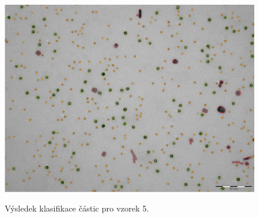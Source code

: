 \documentclass[11pt,twoside,a4paper,table]{book}
\begin{document}
\begin{figure}[h]
\center
\includegraphics[width=\textwidth]{figures/multi7_klasifikace.png}
\label{fig:class5}
\caption{Výsledek klasifikace částic pro vzorek 5.}
\end{figure}
\end{document}
